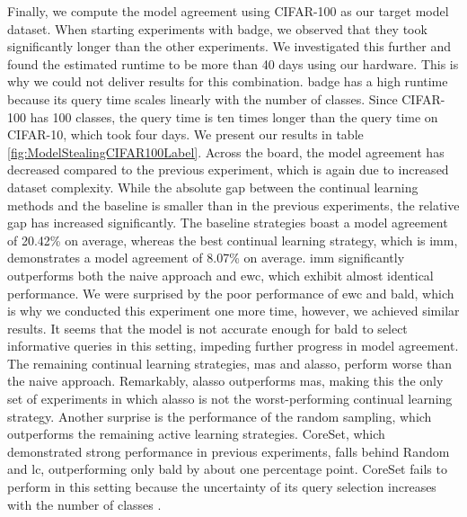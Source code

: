Finally, we compute the model agreement using CIFAR-100 as our target model dataset. When starting experiments with \gls{badge}, we observed that they
took significantly longer than the other experiments. We investigated this further and found the estimated runtime to be more than 40 days using our hardware.
This is why we could not deliver results for this combination.  \gls{badge} has a high runtime because its query time scales linearly with the number of classes. Since
CIFAR-100 has 100 classes, the query time is ten times longer than the query time on CIFAR-10, which took four days. We present our results in table 
\ref{fig:ModelStealingCIFAR100Label}. Across the board, the model agreement has decreased compared to the previous experiment, which is again due to increased dataset
complexity. While the absolute gap between the continual learning methods and the baseline is smaller than in the previous experiments, the relative gap has increased
significantly. The baseline strategies boast a model agreement of 20.42\% on average, whereas the best continual learning strategy, which is \gls{imm}, demonstrates a
model agreement of 8.07\% on average. \gls{imm} significantly outperforms both the naive approach and \gls{ewc}, which exhibit almost identical performance. We were surprised
by the poor performance of \gls{ewc} and \gls{bald}, which is why we conducted this experiment one more time, however, we achieved similar results. It seems that the model is
not accurate enough for \gls{bald} to select informative queries in this setting, impeding further progress in model agreement. The remaining
continual learning strategies, \gls{mas} and \gls{alasso}, perform worse than the naive approach. Remarkably, \gls{alasso} outperforms \gls{mas}, making this the
only set of experiments in which \gls{alasso} is not the worst-performing continual learning strategy. Another surprise is the performance of the random sampling,
which outperforms the remaining active learning strategies. CoreSet, which demonstrated strong performance in previous experiments, falls behind
Random and \gls{lc}, outperforming only \gls{bald} by about one percentage point. CoreSet fails to perform in this setting because the uncertainty of its query
selection increases with the number of classes \cite{sener2017active}. \par

